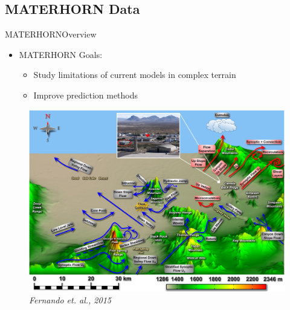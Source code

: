 \documentclass{beamer}
\begin{document}
\subsection{MATERHORN Data}

\begin{frame}{MATERHORN}{Overview}
  \begin{itemize}
  \item {MATERHORN Goals:}
  	\begin{itemize}
  	\item {Study limitations of current models in complex terrain}
  	\item {Improve prediction methods}
  	\end{itemize}
  \end{itemize}
  \begin{figure}
  \includegraphics[scale=.4]{pictures/complex.jpeg}
\\  \tiny{\textit{Fernando et. al., 2015}} %
  \end{figure}
  \end{frame}
  
\end{document}
